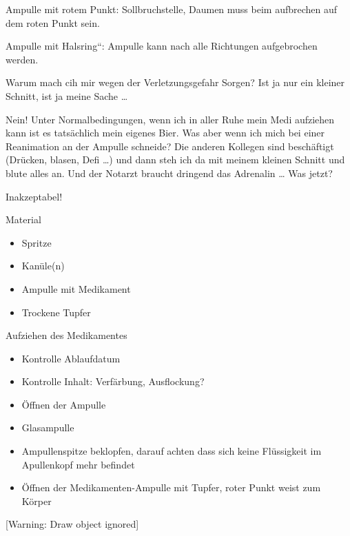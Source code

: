 \documentclass{article}
\begin{document}
Ampulle mit rotem Punkt: Sollbruchstelle, Daumen muss beim aufbrechen
auf dem roten Punkt sein. 

Ampulle mit {\quotedblbase}Halsring{\textquotedblleft}: Ampulle kann
nach alle Richtungen aufgebrochen werden. 

\begin{center}
\begin{minipage}{6.556cm}
Warum mach{\textquotesingle} cih mir wegen der Verletzungsgefahr Sorgen?
Ist ja nur ein kleiner Schnitt, ist ja meine Sache {\dots}

Nein! Unter Normalbedingungen, wenn ich in aller Ruhe mein Medi
aufziehen kann ist es tats\"achlich mein eigenes Bier. Was aber wenn
ich mich bei einer Reanimation an der Ampulle schneide? Die anderen
Kollegen sind besch\"aftigt (Dr\"ucken, blasen, Defi {\dots}) und dann
steh ich da mit meinem kleinen Schnitt und blute alles an. Und der
Notarzt braucht dringend das Adrenalin {\dots} Was jetzt?

Inakzeptabel!

\end{minipage}
\end{center}
Material 

\begin{itemize}
\item Spritze

\item Kan\"ule(n)

\item Ampulle mit Medikament

\item Trockene Tupfer

\end{itemize}
Aufziehen des Medikamentes

\begin{itemize}
\item Kontrolle Ablaufdatum

\item Kontrolle Inhalt: Verf\"arbung, Ausflockung?

\item \"Offnen der Ampulle

\end{itemize}
\begin{itemize}
\item  Glasampulle

\end{itemize}
\begin{itemize}
\item Ampullenspitze beklopfen, darauf achten dass sich keine
Fl\"ussigkeit im Apullenkopf mehr befindet

\item \"Offnen der Medikamenten-Ampulle mit Tupfer, roter Punkt weist
zum K\"orper

\end{itemize}
[Warning: Draw object ignored]
\end{document}

